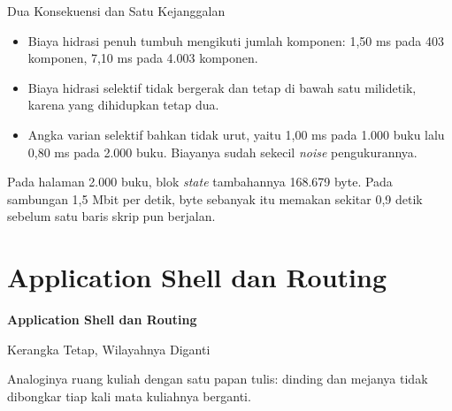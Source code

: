 \documentclass[aspectratio=169, table, 12pt]{beamer}
\begin{document}
\begin{frame}{{\Large Dua Konsekuensi dan Satu Kejanggalan}}
  \vspace{10pt}
  \begin{itemize}
    \item Biaya hidrasi penuh tumbuh mengikuti jumlah komponen: 1,50 ms pada
          403 komponen, 7,10 ms pada 4.003 komponen.
    \item Biaya hidrasi selektif tidak bergerak dan tetap di bawah satu
          milidetik, karena yang dihidupkan tetap dua.
    \item Angka varian selektif bahkan tidak urut, yaitu 1,00 ms pada 1.000
          buku lalu 0,80 ms pada 2.000 buku. Biayanya sudah sekecil
          \textit{noise} pengukurannya.
  \end{itemize}
  \vspace{6pt}
  {\small Pada halaman 2.000 buku, blok \textit{state} tambahannya 168.679
  byte. Pada sambungan 1,5 Mbit per detik, byte sebanyak itu memakan sekitar
  0,9 detik sebelum satu baris skrip pun berjalan.}
\end{frame}

\section{Application Shell dan Routing}

\begin{frame}{\hfill}
  \centering
  \Huge{\textbf{Application Shell dan Routing}}
\end{frame}

\begin{frame}{{\Large Kerangka Tetap, Wilayahnya Diganti}}
  \vspace{4pt}
  \centering

  \vspace{2pt}
  {\small Analoginya ruang kuliah dengan satu papan tulis: dinding dan
  mejanya tidak dibongkar tiap kali mata kuliahnya berganti.}
\end{frame}
\end{document}
